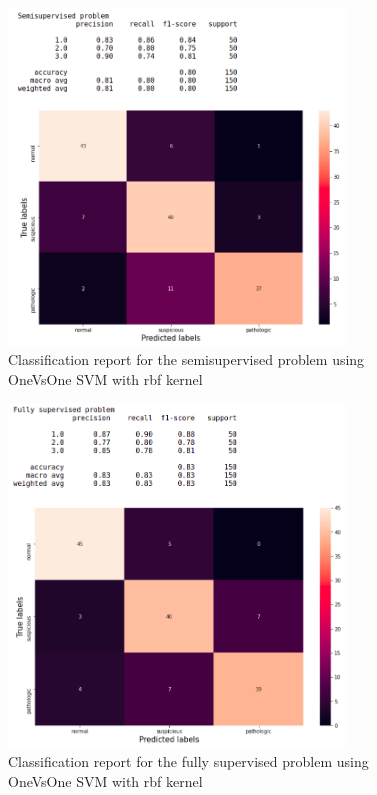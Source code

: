 \documentclass[a4paper,12pt]{article}
\begin{document}
\begin{figure}[H]
  \begin{center}
  \includegraphics[width=0.8\textwidth]{images/semi.png}
  \end{center}
  \caption{Classification report for the semisupervised problem using OneVsOne SVM with rbf kernel}
  \label{fig:semi}
\end{figure}

\begin{figure}[H]
  \begin{center}
  \includegraphics[width=0.8\textwidth]{images/fully.png}
  \end{center}
  \caption{Classification report for the fully supervised problem using OneVsOne SVM with rbf kernel}
  \label{fig:fully}
\end{figure}
\end{document}
